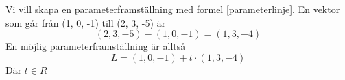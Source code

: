 \documentclass[../../main.tex]{subfiles}
\begin{document}
\begin{solution}{7}
Vi vill skapa en parameterframställning med formel \ref{parameterlinje}. En vektor som går från (1, 0, -1) till (2, 3, -5) är
\[(2, 3, -5) - (1, 0, -1) = (1, 3, -4)\]
En möjlig parameterframställning är alltså 
\[L = (1, 0, -1) + t \cdot (1, 3, -4)\]
Där $t \in R$

\end{solution}
\end{document}
